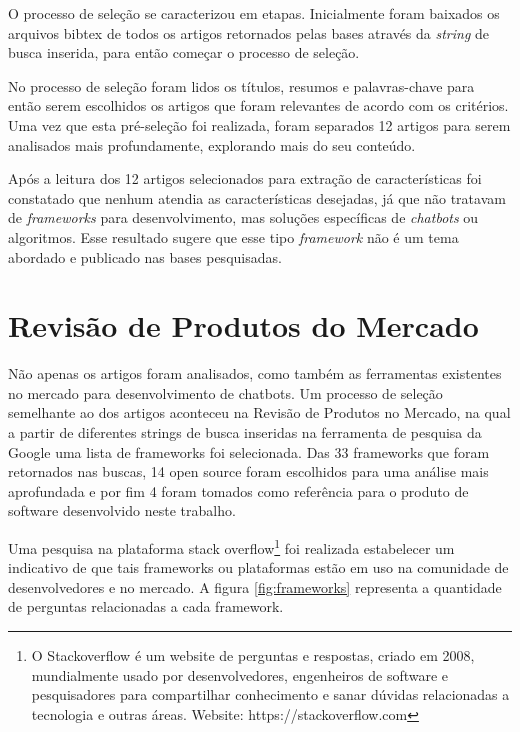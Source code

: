O processo de seleção se caracterizou em etapas. Inicialmente foram baixados os arquivos
bibtex de todos os artigos retornados pelas bases através da \textit{string} de busca inserida, para então começar o
processo de seleção. 

No processo de seleção foram lidos os títulos, resumos e palavras-chave para então serem
escolhidos os artigos que foram relevantes de acordo com os critérios. Uma vez que esta pré-seleção foi realizada, foram separados 12 artigos para serem analisados mais
profundamente, explorando mais do seu conteúdo.

Após a leitura dos 12 artigos selecionados para extração de características foi constatado que nenhum atendia as características desejadas, já que não tratavam de \textit{frameworks} para desenvolvimento, mas soluções específicas de \textit{chatbots} ou algoritmos. Esse resultado sugere que esse tipo \textit{framework} não é um tema abordado e publicado nas bases pesquisadas.


\section{ Revisão de Produtos do Mercado}
Não apenas os artigos foram analisados, como também as ferramentas existentes no
mercado para desenvolvimento de chatbots. Um processo de seleção semelhante ao dos
artigos aconteceu na Revisão de Produtos no Mercado, na qual a partir de diferentes strings de
busca inseridas na ferramenta de pesquisa da Google uma lista de frameworks foi
selecionada. Das 33 frameworks que foram retornados nas buscas, 14 open source foram escolhidos para uma
análise mais aprofundada e por fim 4 foram tomados como referência para o produto de software
desenvolvido neste trabalho.


Uma pesquisa na plataforma stack overflow\footnote{O Stackoverflow é um website de perguntas e respostas, criado em 2008, mundialmente usado por desenvolvedores, engenheiros de software e pesquisadores para compartilhar conhecimento e sanar dúvidas relacionadas a tecnologia e outras áreas. Website: https://stackoverflow.com} foi realizada estabelecer um indicativo de que tais frameworks ou plataformas estão em uso na comunidade de desenvolvedores e no mercado. A figura \ref{fig:frameworks} representa a quantidade de perguntas relacionadas a cada framework.


